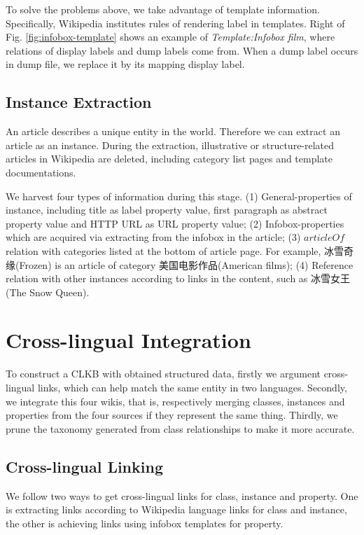 \documentclass[runningheads,a4paper]{llncs}
\begin{document}
To solve the problems above, we take advantage of template information. Specifically, Wikipedia institutes rules of rendering label in templates. Right of Fig. \ref{fig:infobox-template} shows an example of \emph{Template:Infobox film}, where relations of display labels and dump labels come from. When a dump label occurs in dump file, we replace it by its mapping display label.

\subsection{Instance Extraction}
\label{sec:ie}
An article describes a unique entity in the world. Therefore we can extract an article as an instance. During the extraction, illustrative or structure-related articles in Wikipedia are deleted, including category list pages and template documentations.

We harvest four types of information during this stage. (1) General-properties of instance, including title as label property value, first paragraph as abstract property value and HTTP URL as URL property value; (2) Infobox-properties which are acquired via extracting from the infobox in the article; (3) $articleOf$ relation with categories listed at the bottom of article page. For example, 冰雪奇缘(Frozen) is an article of category 美国电影作品(American films); (4) Reference relation with other instances according to links in the content, such as 冰雪女王(The Snow Queen).

\section{Cross-lingual Integration}
\label{sec:cli}

To construct a CLKB with obtained structured data, firstly we argument cross-lingual links, which can help match the same entity in two languages. Secondly, we integrate this four wikis, that is, respectively merging classes, instances and properties from the four sources if they represent the same thing. Thirdly, we prune the taxonomy generated from class relationships to make it more accurate.

\subsection{Cross-lingual Linking}
We follow two ways to get cross-lingual links for class, instance and property. One is extracting links according to Wikipedia language links for class and instance, the other is achieving links using infobox templates for property. 
\end{document}

